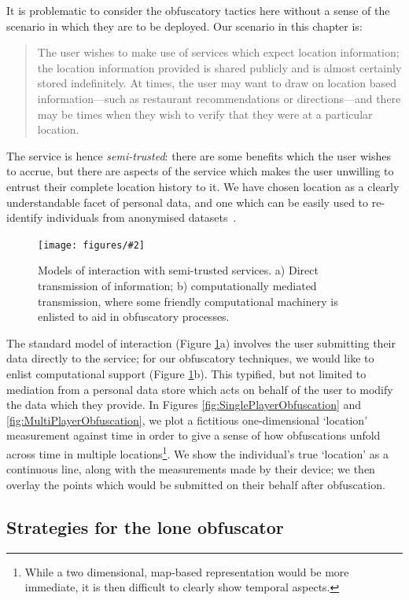 \documentclass{IOS-Book-Article}     %
\newcommand{\fig}[3][0.9]{
\begin{figure}[tp]
\begin{center}
\texttt{[image: figures/\#2]}
\caption{#3}
\label{fig:#2}
\end{center}
\end{figure}
}
\begin{document}
It is problematic to consider the obfuscatory tactics here without a sense of
the scenario in which they are to be deployed. Our scenario in this chapter is:
\begin{quote}
The user wishes to make use of services which expect location information; 
the location information provided is shared publicly and is almost
certainly stored indefinitely. At times, the user may want to draw on location
based information---such as restaurant recommendations or directions---and there
may be times when they wish to verify that they were at a particular location.
\end{quote}
The service is hence \emph{semi-trusted}: there are some benefits which the user
wishes to accrue, but there are aspects of the service which makes the user
unwilling to entrust their complete location history to it. We have chosen location
as a clearly understandable facet of personal data, and one which can be easily
used to re-identify individuals from anonymised
datasets~\cite{montjoye2013Unique}.

\fig{Mediation}{Models of interaction with semi-trusted services. a) Direct
transmission of information; b) computationally mediated transmission, where 
some friendly computational machinery is enlisted to aid in
obfuscatory processes.}

The standard model of interaction (Figure \ref{fig:Mediation}a) involves the
user submitting their data directly to the service; for our obfuscatory
techniques, we would like to enlist computational support (Figure
\ref{fig:Mediation}b). This typified, but not limited to mediation from a
personal data store which acts on behalf of the user to modify the data which
they provide.
In Figures \ref{fig:SinglePlayerObfuscation} and
\ref{fig:MultiPlayerObfuscation}, we plot a fictitious one-dimensional
`location' measurement against time in order to give a sense of how
obfuscations unfold across time in multiple locations\footnote{While a two
dimensional, map-based representation would be more immediate, it is then
difficult to clearly show temporal aspects.}. We show the individual's true `location' as
a continuous line, along with the measurements made by their device; we then
overlay the points which would be submitted on their behalf after obfuscation.

\subsection{Strategies for the lone obfuscator}
\end{document}
